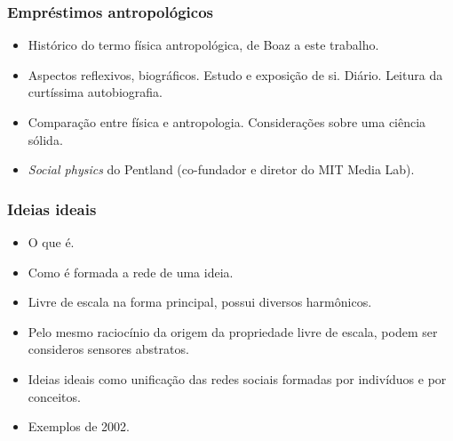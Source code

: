 \documentclass[10pt]{beamer}
\begin{document}
\begin{frame}
\frametitle{Empréstimos antropológicos}
\begin{itemize}
\item Histórico do termo física antropológica, de Boaz a este trabalho.
\item Aspectos reflexivos, biográficos. Estudo e exposição de si. Diário. Leitura da curtíssima autobiografia.
\item Comparação entre física e antropologia. Considerações sobre uma ciência sólida.
\item \emph{Social physics} do Pentland (co-fundador e diretor do MIT Media Lab).
\end{itemize}
\end{frame}

\begin{frame}
\frametitle{Ideias ideais}
\begin{itemize}
\item O que é.
\item Como é formada a rede de uma ideia.
\item Livre de escala na forma principal, possui diversos harmônicos.
\item Pelo mesmo raciocínio da origem da propriedade livre de escala, podem ser consideros sensores abstratos.
\item Ideias ideais como unificação das redes sociais formadas por indivíduos e por conceitos.
\item Exemplos de 2002.
\end{itemize}
\end{frame}
\end{document}
